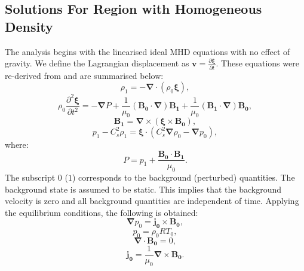 \documentclass[12pt,a4paper,twoside]{article}
\begin{document}
\subsection{Solutions For Region with Homogeneous Density}
The analysis begins with the linearised ideal MHD equations with no effect of gravity. We define the Lagrangian displacement as $\boldsymbol{v} = \frac{\partial \boldsymbol{\xi}}{\partial t}$. These equations were re-derived from \cite{Ruderman2009} and are summarised below:
\begin{equation} \label{q1}
\rho_1 = - \boldsymbol{\nabla} \cdot ( \rho_0 \boldsymbol{ \xi }  ) ,
\end{equation}
\begin{equation} \label{q2}
\rho_0 \frac{ \partial^2 \boldsymbol{\xi} }{\partial t^2} = - \boldsymbol{\nabla} P + \frac{1}{\mu_0} \left( \boldsymbol{B_0} \cdot \boldsymbol{\nabla} \right) \boldsymbol{B_1} + \frac{1}{\mu_0} \left( \boldsymbol{B_1} \cdot \boldsymbol{\nabla} \right) \boldsymbol{B_0} , 
\end{equation}
\begin{equation} \label{q3}
\boldsymbol{B_1} = \boldsymbol{\nabla} \times ( \boldsymbol{\xi} \times \boldsymbol{B_0} ) ,
\end{equation}
\begin{equation} \label{q4}
p_1 - C^2_s \rho_1 = \boldsymbol{\xi} \cdot (C^2_s \boldsymbol{\nabla} \rho_0 - \boldsymbol{\nabla} p_0) ,
\end{equation} 
where:
\begin{equation}\label{eq94}
P = p_1 + \frac{\boldsymbol{B_0} \cdot \boldsymbol{B_1}}{ \mu_0} .
\end{equation}
The subscript $0$ ($1$) corresponds to the background (perturbed) quantities. The background state is assumed to be static. This implies that the background velocity is zero and all background quantities are independent of time. Applying the equilibrium conditions, the following is obtained:
\begin{equation} \label{q5}
\boldsymbol{ \nabla} p_0 = \boldsymbol{j_0} \times \boldsymbol{B_0} ,
\end{equation} 
\begin{equation} \label{q6}
p_0 = \rho_0 R T_0 ,
\end{equation}
\begin{equation} \label{q7}
\boldsymbol{\nabla} \cdot \boldsymbol{B_0} = 0 ,
\end{equation}
\begin{equation} \label{q8}
\boldsymbol{j_0} = \frac{1}{ \mu_0 } \boldsymbol{\nabla} \times \boldsymbol{B_0} .
\end{equation}
\end{document}
